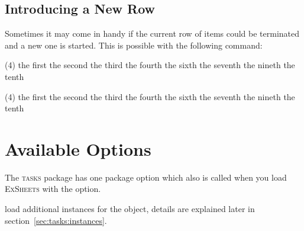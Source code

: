 \documentclass[DIV9,toc=index,toc=bib,numbers=noendperiod]{cnpkgdoc}
\makeatletter
\newcommand*\Tasks{{\scshape\textcolor{main}{tasks}}\xspace}
\newcommand*\ExSheets{{\scshape\textcolor{main}{ExSheets}}\xspace}
\newcommand*\sinceversion[1]{%
  \@bsphack
  \marginnote{%
    \footnotesize\sffamily\RaggedRight
    \textcolor{black!75}{Introduced in version~#1}}%
  \@esphack}
\makeatother
\begin{document}
\subsection{Introducing a New Row}
\noindent\sinceversion{0.9}Sometimes it may come in handy if the current
row of items could be terminated and a new one is started.  This is possible
with the following command:
\begin{beschreibung}
\end{beschreibung}
\begin{beispiel}
 \begin{tasks}(4)
  \task the first
  \task the second
  \task the third
  \task the fourth
  \task {} \startnewitemline
  \task the sixth
  \task the seventh
  \task {} \startnewitemline
  \task the nineth
  \task the tenth
 \end{tasks}
\end{beispiel}
\begin{tasks}(4)
 \task the first
 \task the second
 \task the third
 \task the fourth
 \task {} \startnewitemline
 \task the sixth
 \task the seventh
 \task {} \startnewitemline
 \task the nineth
 \task the tenth
\end{tasks}

\section{Available Options}\label{sec:tasks:options}
The \Tasks package has one package option which also is called when you load
\ExSheets with the  option.
\begin{beschreibung}
 \newline
   load additional instances for the  object, details are explained
   later in section~\ref{sec:tasks:instances}.
\end{beschreibung}
\end{document}
